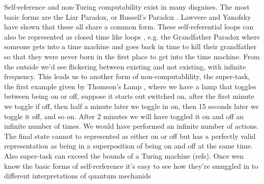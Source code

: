 Self-reference and non-Turing computability exist in many disguises. The most basic forms are the Liar Paradox,  or Russell's Paradox . Lawvere \autocite{Lawvere_1969} and Yanofsky \autocite{Yanofsky2003} have shown that these all share a common form. These self-referential loops can also be represented as closed time like loops , e.g. the Grandfather Paradox where someone gets into a time machine and goes back in time to kill their grandfather so that they were never born in the first place to get into the time machine. From the outside we'd see flickering between existing and not existing, with infinite frequency. This leads us to another form of non-computablility, the super-task, the first example given by Thomson's Lamp \autocite{Svozil2009}, where we have a lamp that toggles between being on or off, suppose it starts out switched on, after the first minute we toggle if off, then half a minute later we toggle in on, then 15 seconds later we toggle it off, and so on. After 2 minutes we will have toggled it on and off an infinite number of times. We would have performed an infinite number of actions. The final state cannot to represented as either on or off but has a perfectly valid representation as being in a superposition of being on and off at the same time. Also super-task can exceed the bounds of a Turing machine (refs). Once wen know the basic forms of self-rerference it's easy to see how they're smuggled in to different interpretations of quantum mechanids

